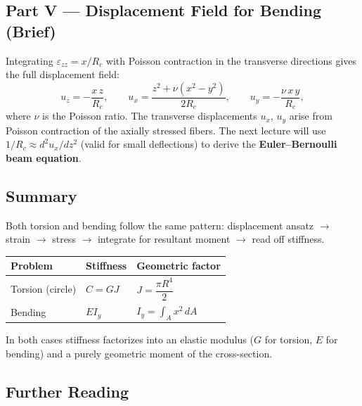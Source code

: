 \documentclass[../main.tex]{subfiles}
\begin{document}
\subsection*{Part V — Displacement Field for Bending (Brief)}

Integrating $\varepsilon_{zz} = x/R_c$ with Poisson contraction in the transverse directions gives the full displacement field:
\begin{equation}
    u_z = -\frac{x\,z}{R_c}, \qquad
    u_x = \frac{z^2 + \nu(x^2 - y^2)}{2R_c}, \qquad
    u_y = -\frac{\nu\,x\,y}{R_c},
    \label{eq:lec08_bending_displacement}
\end{equation}
where $\nu$ is the Poisson ratio. The transverse displacements $u_x$, $u_y$ arise from Poisson contraction of the axially stressed fibers. The next lecture will use $1/R_c \approx d^2 u_x/dz^2$ (valid for small deflections) to derive the \textbf{Euler--Bernoulli beam equation}.

\subsection*{Summary}

Both torsion and bending follow the same pattern: displacement ansatz $\to$ strain $\to$ stress $\to$ integrate for resultant moment $\to$ read off stiffness.

\begin{center}
\renewcommand{\arraystretch}{1.6}
\begin{tabular}{lll}
    \toprule
    Problem & Stiffness & Geometric factor \\
    \midrule
    Torsion (circle) & $C = GJ$ & $J = \dfrac{\pi R^4}{2}$ \\[6pt]
    Bending & $EI_y$ & $I_y = \displaystyle\int_A x^2\,dA$ \\
    \bottomrule
\end{tabular}
\end{center}

In both cases stiffness factorizes into an elastic modulus ($G$ for torsion, $E$ for bending) and a purely geometric moment of the cross-section.

\subsection*{Further Reading}
\end{document}
